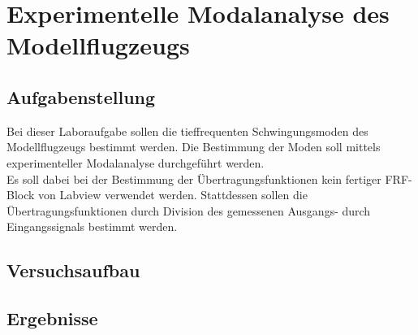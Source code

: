 \chapter{Experimentelle Modalanalyse des Modellflugzeugs}
\label{sec: Hauptkapitel 1}

\section{Aufgabenstellung}
    Bei dieser Laboraufgabe sollen die tieffrequenten Schwingungsmoden des
    Modellflugzeugs bestimmt werden. Die Bestimmung der Moden soll mittels
    experimenteller Modalanalyse durchgeführt werden.
    \\

    \noindent
    Es soll dabei bei der Bestimmung der Übertragungsfunktionen kein fertiger
    FRF-Block von Labview verwendet werden. Stattdessen sollen die
    Übertragungsfunktionen durch Division des gemessenen Ausgangs- durch
    Eingangssignals bestimmt werden.

\section{Versuchsaufbau}

\section{Ergebnisse}
